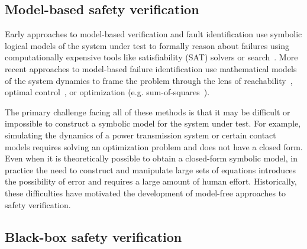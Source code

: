 \subsection{Model-based safety verification}

Early approaches to model-based verification and fault identification use symbolic logical models of the system under test to formally reason about failures using computationally expensive tools like satisfiability (SAT) solvers or search~\cite{dekleerDiagnosingMultipleFaults1987,benardRemoteAgentExperiment2000}. More recent approaches to model-based failure identification use mathematical models of the system dynamics to frame the problem through the lens of reachability~\cite{annpureddySTaLiRoToolTemporal2011,bansalHamiltonJacobiReachabilityBrief2017}, optimal control~\cite{chouUsingControlSynthesis2018}, or optimization (e.g. sum-of-squares~\cite{ahmadiApplicationsPolynomialOptimization2016,majumdarControlVerificationHighdimensional2014}).

The primary challenge facing all of these methods is that it may be difficult or impossible to construct a symbolic model for the system under test. For example, simulating the dynamics of a power transmission system or certain contact models requires solving an optimization problem and does not have a closed form. Even when it is theoretically possible to obtain a closed-form symbolic model, in practice the need to construct and manipulate large sets of equations introduces the possibility of error and requires a large amount of human effort.  Historically, these difficulties have motivated the development of model-free approaches to safety verification.

\subsection{Black-box safety verification}

